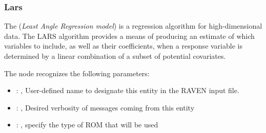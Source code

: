 \subsubsection{Lars}
  The  (\textit{Least Angle Regression model})                         is a regression
  algorithm for high-dimensional data.                         The LARS algorithm provides a means
  of producing an estimate of which variables                         to include, as well as their
  coefficients, when a response variable is                         determined by a linear
  combination of a subset of potential covariates.

  The  node recognizes the following parameters:
    \begin{itemize}
      \item {}: ,
        User-defined name to designate this entity in the RAVEN input file.
      \item {}: ,
        Desired verbosity of messages coming from this entity
      \item {}: ,
        specify the type of ROM that will be used
  \end{itemize}

